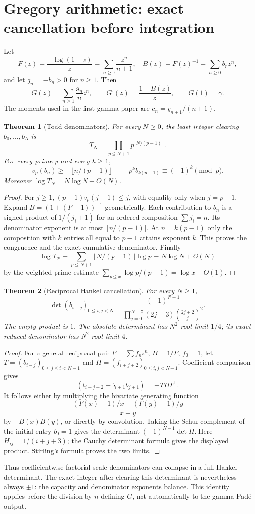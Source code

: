 \documentclass[11pt,a4paper]{article}
\newtheorem{theorem}{Theorem}[section]
\theoremstyle{definition}
\theoremstyle{remark}
\numberwithin{equation}{section}
\begin{document}
\section{Gregory arithmetic: exact cancellation before integration}
\label{ec:gregory}

Let
\[
 F(z)=\frac{-\log(1-z)}z=\sum_{n\ge0}\frac{z^n}{n+1},\quad
 B(z)=F(z)^{-1}=\sum_{n\ge0}b_nz^n,
\]
and let $g_n=-b_n>0$ for $n\ge1$.  Then
\[
 G(z)=\sum_{n\ge1}\frac{g_n}{n}z^n,\qquad
 G'(z)=\frac{1-B(z)}z,\qquad G(1)=\gamma.
\]
The moments used in the first gamma paper are
$c_n=g_{n+1}/(n+1)$.

\begin{theorem}[Todd denominators]
\label{ec:todd}
For every $N\ge0$, the least integer clearing $b_0,\ldots,b_N$ is
\[
 T_N=\prod_{p\le N+1}p^{\lfloor N/(p-1)\rfloor}.
\]
For every prime $p$ and every $k\ge1$,
\[
 v_p(b_n)\ge-\lfloor n/(p-1)\rfloor,\qquad
 p^kb_{k(p-1)}\equiv(-1)^k\pmod p.
\]
Moreover $\log T_N=N\log N+O(N)$.
\end{theorem}
\begin{proof}
For $j\ge1$, $(p-1)v_p(j+1)\le j$, with equality only when $j=p-1$.
Expand $B=(1+(F-1))^{-1}$ geometrically.  Each contribution to $b_n$
is a signed product of $1/(j_i+1)$ for an ordered composition
$\sum j_i=n$.  Its denominator exponent is at most
$\lfloor n/(p-1)\rfloor$.  At $n=k(p-1)$ only the composition with
$k$ entries all equal to $p-1$ attains exponent $k$.  This proves the
congruence and the exact cumulative denominator.  Finally
\[
 \log T_N=\sum_{p\le N+1}\lfloor N/(p-1)\rfloor\log p
 =N\log N+O(N)
\]
by the weighted prime estimate
$\sum_{p\le x}\log p/(p-1)=\log x+O(1)$.
\end{proof}

\begin{theorem}[Reciprocal Hankel cancellation]
\label{ec:reciprocal-hankel}
For every $N\ge1$,
\[
 \det(b_{i+j})_{0\le i,j<N}
 =\frac{(-1)^{N-1}}
 {\displaystyle\prod_{j=0}^{N-2}(2j+3)\binom{2j+2}{j}^{2}}.
\]
The empty product is $1$.  The absolute determinant has $N^2$-root
limit $1/4$; its exact reduced denominator has $N^2$-root limit $4$.
\end{theorem}
\begin{proof}
For a general reciprocal pair $F=\sum f_nz^n$, $B=1/F$, $f_0=1$,
let $T=(b_{i-j})_{0\le j\le i<N-1}$ and
$H=(f_{i+j+2})_{0\le i,j<N-1}$.  Coefficient comparison gives
\[
 (b_{i+j+2}-b_{i+1}b_{j+1})=-THT^{\mathsf T}.
\]
It follows either by multiplying the bivariate generating function
\[
 \frac{(F(x)-1)/x-(F(y)-1)/y}{x-y}
\]
by $-B(x)B(y)$, or directly by convolution.  Taking the Schur complement
of the initial entry $b_0=1$ gives the determinant $(-1)^{N-1}\det H$.
Here $H_{ij}=1/(i+j+3)$; the Cauchy determinant formula gives the displayed
product.  Stirling's formula proves the two limits.
\end{proof}
Thus coefficientwise factorial-scale denominators can collapse in a full
Hankel determinant.  The exact integer after clearing this determinant
is nevertheless always $\pm1$: the capacity and denominator exponents
balance.  This identity applies before the division by $n$ defining $G$,
not automatically to the gamma Pad\'e output.
\end{document}

